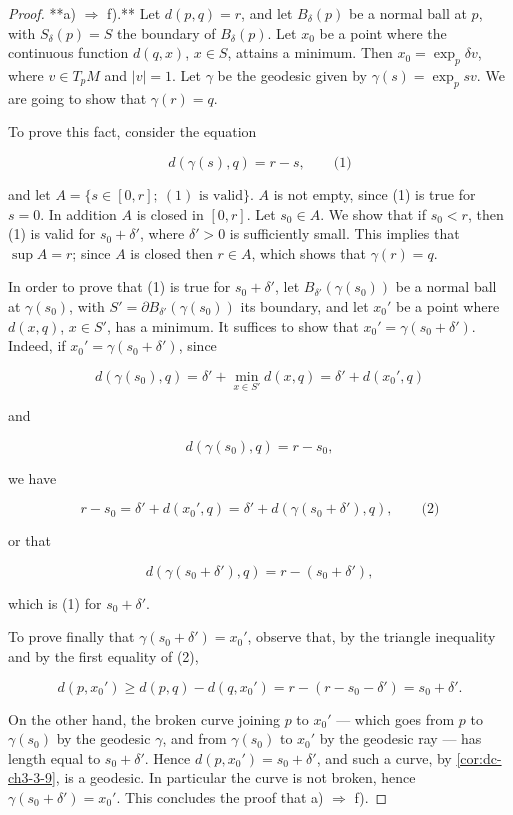 \begin{proof}
  **a) $\Rightarrow$ f).** Let $d(p,q)=r$, and let $B_\delta(p)$ be a normal ball at
  $p$, with $S_\delta(p)=S$ the boundary of $B_\delta(p)$. Let $x_0$ be a point
  where the continuous function $d(q,x)$, $x\in S$, attains a minimum. Then
  $x_0=\exp_p\delta v$, where $v\in T_pM$ and $|v|=1$. Let $\gamma$ be the geodesic
  given by $\gamma(s)=\exp_p sv$. We are going to show that $\gamma(r)=q$.
  
  To prove this fact, consider the equation
  
  $$
  d(\gamma(s),q)=r-s,\qquad\text{(1)}
  $$
  
  and let $A=\{s\in[0,r];\ (1)\text{ is valid}\}$. $A$ is not empty, since (1) is
  true for $s=0$. In addition $A$ is closed in $[0,r]$. Let $s_0\in A$. We show that
  if $s_0<r$, then (1) is valid for $s_0+\delta'$, where $\delta'>0$ is sufficiently
  small. This implies that $\sup A=r$; since $A$ is closed then $r\in A$, which
  shows that $\gamma(r)=q$.
  
  In order to prove that (1) is true for $s_0+\delta'$, let $B_{\delta'}(\gamma(s_0))$
  be a normal ball at $\gamma(s_0)$, with $S'=\partial B_{\delta'}(\gamma(s_0))$ its
  boundary, and let $x_0'$ be a point where $d(x,q)$, $x\in S'$, has a minimum. It
  suffices to show that $x_0'=\gamma(s_0+\delta')$. Indeed, if
  $x_0'=\gamma(s_0+\delta')$, since
  
  $$
  d(\gamma(s_0),q)=\delta'+\min_{x\in S'} d(x,q)=\delta'+d(x_0',q)
  $$
  
  and
  
  $$
  d(\gamma(s_0),q)=r-s_0,
  $$
  
  we have
  
  $$
  r-s_0=\delta'+d(x_0',q)=\delta'+d(\gamma(s_0+\delta'),q),\qquad\text{(2)}
  $$
  
  or that
  
  $$
  d(\gamma(s_0+\delta'),q)=r-(s_0+\delta'),
  $$
  
  which is (1) for $s_0+\delta'$.
  
  To prove finally that $\gamma(s_0+\delta')=x_0'$, observe that, by the triangle
  inequality and by the first equality of (2),
  
  $$
  d(p,x_0')\ge d(p,q)-d(q,x_0')=r-(r-s_0-\delta')=s_0+\delta'.
  $$
  
  On the other hand, the broken curve joining $p$ to $x_0'$ — which goes from $p$ to
  $\gamma(s_0)$ by the geodesic $\gamma$, and from $\gamma(s_0)$ to $x_0'$ by the
  geodesic ray — has length equal to $s_0+\delta'$. Hence $d(p,x_0')=s_0+\delta'$,
  and such a curve, by \cref{cor:dc-ch3-3-9}, is a geodesic. In particular the
  curve is not broken, hence $\gamma(s_0+\delta')=x_0'$. This concludes the proof
  that a) $\Rightarrow$ f).
  

\end{proof}
